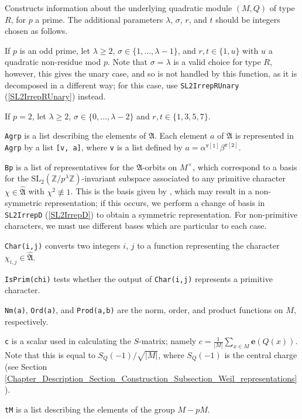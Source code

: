 \documentclass[a4paper,11pt]{report}
\begin{document}
{{{ Constructs information about the underlying quadratic module $(M,Q)$ of type $R$, for $p$ a prime. The additional parameters $\lambda$, $\sigma$, $r$, and $t$ should be integers chosen as follows. 

 If $p$ is an odd prime, let $\lambda \geq 2$, $\sigma \in \{1, \dots, \lambda - 1\}$, and $r,t \in \{1,u\}$ with $u$ a quadratic non-residue mod $p$. Note that $\sigma = \lambda$ is a valid choice for type $R$, however, this gives the unary case, and so is not handled by this function,
as it is decomposed in a different way; for this case, use \texttt{SL2IrrepRUnary} (\ref{SL2IrrepRUnary}) instead. 

 If $p=2$, let $\lambda \geq 2$, $\sigma \in \{0, \dots, \lambda-2\}$ and $r,t \in \{1,3,5,7\}$. 

 \texttt{Agrp} is a list describing the elements of $\mathfrak{A}$. Each element $a$ of $\mathfrak{A}$ is represented in \texttt{Agrp} by a list \texttt{[v, a]}, where \texttt{v} is a list defined by $a = \alpha^{\mathtt{v[1]}} \beta^{\mathtt{v[2]}}$. 

 \texttt{Bp} is a list of representatives for the $\mathfrak{A}$-orbits on $M^\times$, which correspond to a basis for the $\mathrm{SL}_2(\mathbb{Z}/p^\lambda\mathbb{Z})$-invariant subspace associated to any primitive character $\chi \in \widehat{\mathfrak{A}}$ with $\chi^2 \not\equiv 1$. This is the basis given by \cite{NW76}, which may result in a non-symmetric representation; if this occurs, we
perform a change of basis in \texttt{SL2IrrepD} (\ref{SL2IrrepD}) to obtain a symmetric representation. For non-primitive characters, we must
use different bases which are particular to each case. 

 \texttt{Char(i,j)} converts two integers $i$, $j$ to a function representing the character $\chi_{i,j} \in \widehat{\mathfrak{A}}$. 

 \texttt{IsPrim(chi)} tests whether the output of \texttt{Char(i,j)} represents a primitive character. 

 \texttt{Nm(a)}, \texttt{Ord(a)}, and \texttt{Prod(a,b)} are the norm, order, and product functions on $M$, respectively. 

 \texttt{c} is a scalar used in calculating the $S$-matrix; namely $c = \frac{1}{|M|} \sum_{x \in M} \mathbf{e}(Q(x))$. Note that this is equal to $S_Q(-1) / \sqrt{|M|}$, where $S_Q(-1)$ is the central charge (see Section \ref{Chapter_Description_Section_Construction_Subsection_Weil_representations}). 

 \texttt{tM} is a list describing the elements of the group $M - pM$. }

}}
\end{document}
